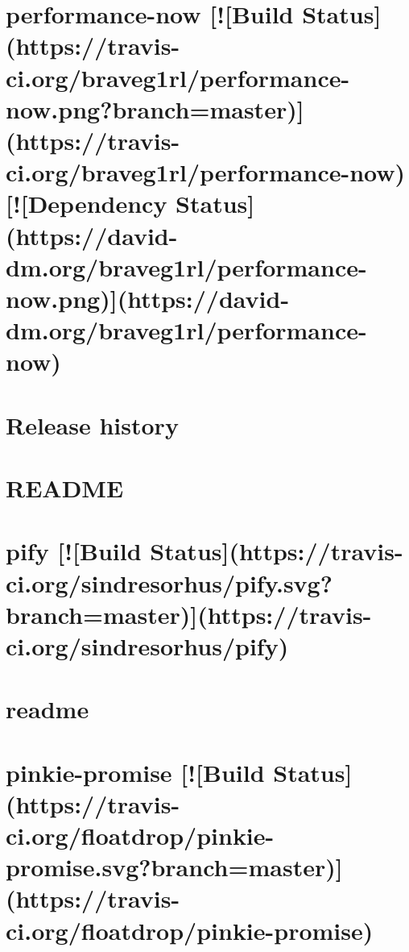 \documentclass[twoside]{book}
\newcommand{\+}{\discretionary{\mbox{\scriptsize$\hookleftarrow$}}{}{}}
\begin{document}
\chapter{performance-\/now \mbox{[}!\mbox{[}Build Status\mbox{]}(https\+://travis-\/ci.org/braveg1rl/performance-\/now.png?branch=master)\mbox{]}(https\+://travis-\/ci.org/braveg1rl/performance-\/now) \mbox{[}!\mbox{[}Dependency Status\mbox{]}(https\+://david-\/dm.org/braveg1rl/performance-\/now.png)\mbox{]}(https\+://david-\/dm.org/braveg1rl/performance-\/now)}
\label{md_dsmacc_examples_DRmerge_node_modules_performance-now_README}

\chapter{Release history}
\label{md_dsmacc_examples_DRmerge_node_modules_picomatch_CHANGELOG}

\chapter{R\+E\+A\+D\+ME}
\label{md_dsmacc_examples_DRmerge_node_modules_picomatch_README}

\chapter{pify \mbox{[}!\mbox{[}Build Status\mbox{]}(https\+://travis-\/ci.org/sindresorhus/pify.svg?branch=master)\mbox{]}(https\+://travis-\/ci.org/sindresorhus/pify)}
\label{md_dsmacc_examples_DRmerge_node_modules_pify_readme}

\chapter{readme}
\label{md_dsmacc_examples_DRmerge_node_modules_pinkie_readme}

\chapter{pinkie-\/promise \mbox{[}!\mbox{[}Build Status\mbox{]}(https\+://travis-\/ci.org/floatdrop/pinkie-\/promise.svg?branch=master)\mbox{]}(https\+://travis-\/ci.org/floatdrop/pinkie-\/promise)}
\label{md_dsmacc_examples_DRmerge_node_modules_pinkie-promise_readme}

\end{document}
